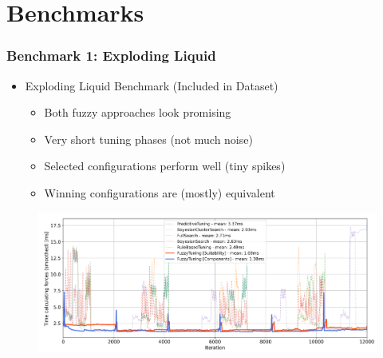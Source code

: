 \documentclass[
	10pt,
	t		%
]{beamer}
\begin{document}
\section{Benchmarks}
\begin{frame}
	\frametitle{Benchmark 1: Exploding Liquid}
	\begin{itemize}
		\item Exploding Liquid Benchmark (Included in Dataset)
		      \begin{itemize}
			      \item Both fuzzy approaches look promising
			      \item Very short tuning phases (not much noise)
			      \item Selected configurations perform well (tiny spikes)
			      \item Winning configurations are (mostly) equivalent
		      \end{itemize}
	\end{itemize}

	\begin{figure}
		\centering
		\includegraphics[width=1\textwidth]{figures/exploding-liquid-timings.png}
	\end{figure}
\end{frame}
\end{document}
